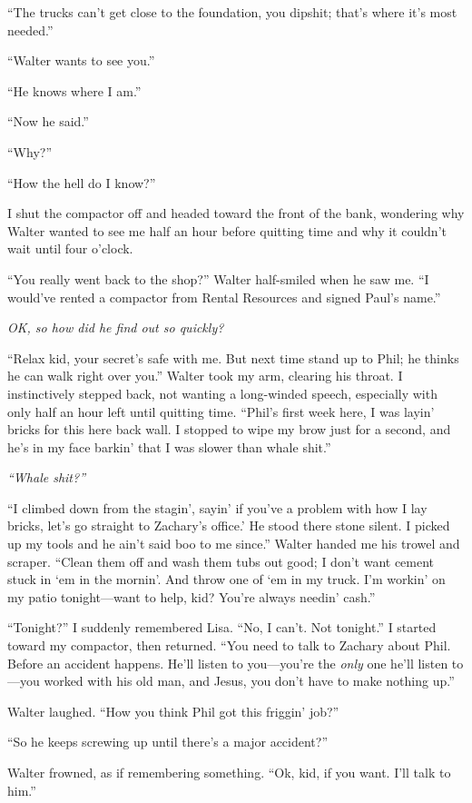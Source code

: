``The trucks can't get close to the foundation, you dipshit; that's
where it's most needed.''

``Walter wants to see you.''

``He knows where I am.''

``Now he said.''

``Why?''

``How the hell do I know?''

I shut the compactor off and headed toward the front of the bank,
wondering why Walter wanted to see me half an hour before quitting time
and why it couldn't wait until four o'clock.

``You really went back to the shop?'' Walter half-smiled when he saw me.
``I would've rented a compactor from Rental Resources and signed Paul's
name.''

\emph{OK, so how did he find out so quickly?}

``Relax kid, your secret's safe with me. But next time stand up to Phil;
he thinks he can walk right over you.'' Walter took my arm, clearing his
throat. I instinctively stepped back, not wanting a long-winded speech,
especially with only half an hour left until quitting time. ``Phil's
first week here, I was layin' bricks for this here back wall. I stopped
to wipe my brow just for a second, and he's in my face barkin' that I
was slower than whale shit.''

\emph{``Whale shit?''}

``I climbed down from the stagin', sayin' if you've a problem with how I
lay bricks, let's go straight to Zachary's office.' He stood there stone
silent. I picked up my tools and he ain't said boo to me since.'' Walter
handed me his trowel and scraper. ``Clean them off and wash them tubs
out good; I don't want cement stuck in `em in the mornin'. And throw one
of `em in my truck. I'm workin' on my patio tonight---want to help, kid?
You're always needin' cash.''

``Tonight?'' I suddenly remembered Lisa. ``No, I can't. Not tonight.'' I
started toward my compactor, then returned. ``You need to talk to
Zachary about Phil. Before an accident happens. He'll listen to
you---you're the \emph{only} one he'll listen to---you worked with his
old man, and Jesus, you don't have to make nothing up.''

Walter laughed. ``How you think Phil got this friggin' job?''

``So he keeps screwing up until there's a major accident?''

Walter frowned, as if remembering something. ``Ok, kid, if you want.
I'll talk to him.''

